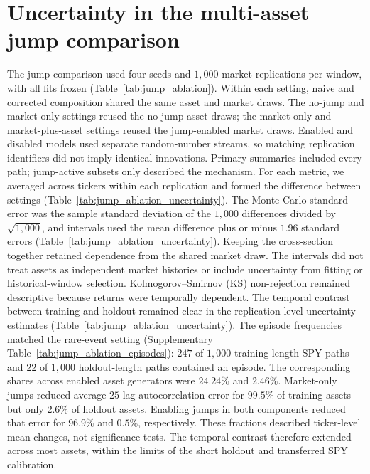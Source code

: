 \section{Uncertainty in the multi-asset jump comparison}
\label{sec:supp-jump-composition}

The jump comparison used four seeds and $1{,}000$ market
replications per window, with all fits frozen (Table~\ref{tab:jump_ablation}). Within each setting,
naive and corrected composition shared the same asset and market
draws. The no-jump and market-only settings reused the no-jump asset
draws; the market-only and market-plus-asset settings reused the
jump-enabled market draws. Enabled and disabled models used separate
random-number streams, so matching replication identifiers did not
imply identical innovations. Primary summaries included every path;
jump-active subsets only described the mechanism.
For each metric, we averaged across tickers within each replication
and formed the difference between settings
(Table~\ref{tab:jump_ablation_uncertainty}). The Monte Carlo standard
error was the sample standard deviation of the $1{,}000$ differences
divided by $\sqrt{1{,}000}$, and intervals used the mean difference
plus or minus $1.96$ standard errors
(Table~\ref{tab:jump_ablation_uncertainty}). Keeping the cross-section
together retained dependence from the shared market draw. The
intervals did not treat assets as independent market histories or
include uncertainty from fitting or historical-window selection.
Kolmogorov--Smirnov (KS) non-rejection remained descriptive because
returns were temporally dependent.
The temporal contrast between training and holdout remained clear
in the replication-level uncertainty estimates
(Table~\ref{tab:jump_ablation_uncertainty}). The episode frequencies
matched the rare-event setting (Supplementary Table~\ref{tab:jump_ablation_episodes}):
$247$ of
$1{,}000$ training-length SPY paths and $22$ of $1{,}000$ holdout-length
paths contained an episode. The corresponding shares across enabled
asset generators were $24.24\%$ and $2.46\%$. Market-only jumps
reduced average $25$-lag autocorrelation error for $99.5\%$ of
training assets but only $2.6\%$ of holdout assets. Enabling jumps in
both components reduced that error for $96.9\%$ and $0.5\%$,
respectively. These fractions described ticker-level mean changes,
not significance tests. The temporal contrast therefore extended
across most assets, within the limits of the short holdout and
transferred SPY calibration.

